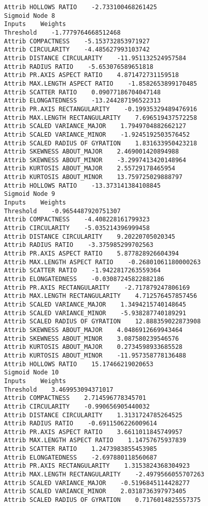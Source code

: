 \documentclass[
	article,			%
	11pt,				%
	oneside,			%
	a4paper,			%
	english,			%
	brazil,				%
	sumario=tradicional
	]{abntex2}
\begin{document}
\begin{lstlisting}
Attrib HOLLOWS RATIO    -2.733100468261425
Sigmoid Node 8
Inputs    Weights
Threshold    -1.7779764668512468
Attrib COMPACTNESS    -5.153732853971927
Attrib CIRCULARITY    -4.485627993103742
Attrib DISTANCE CIRCULARITY    -11.951132524957584
Attrib RADIUS RATIO    -5.653076589651818
Attrib PR.AXIS ASPECT RATIO    4.871472731159518
Attrib MAX.LENGTH ASPECT RATIO    -1.8582653899170485
Attrib SCATTER RATIO    0.09077186704047148
Attrib ELONGATEDNESS    -13.244287196522313
Attrib PR.AXIS RECTANGULARITY    -0.19935329489476916
Attrib MAX.LENGTH RECTANGULARITY    7.696519437572258
Attrib SCALED VARIANCE_MAJOR    1.7949704882662127
Attrib SCALED VARIANCE_MINOR    -1.9245192503576452
Attrib SCALED RADIUS OF GYRATION    1.831633950423218
Attrib SKEWNESS ABOUT_MAJOR    2.469001420894988
Attrib SKEWNESS ABOUT_MINOR    -3.2997413420148964
Attrib KURTOSIS ABOUT_MAJOR    2.55729178465954
Attrib KURTOSIS ABOUT_MINOR    13.759725029888797
Attrib HOLLOWS RATIO    -13.373141384108845
Sigmoid Node 9
Inputs    Weights
Threshold    -0.9654487920751307
Attrib COMPACTNESS    -4.408228161799323
Attrib CIRCULARITY    -5.035214396999458
Attrib DISTANCE CIRCULARITY    9.20220705020345
Attrib RADIUS RATIO    -3.375985299702563
Attrib PR.AXIS ASPECT RATIO    5.877828926604394
Attrib MAX.LENGTH ASPECT RATIO    -0.26801061180000263
Attrib SCATTER RATIO    -1.9422817263559364
Attrib ELONGATEDNESS    -0.03087245822882186
Attrib PR.AXIS RECTANGULARITY    -2.717879247806169
Attrib MAX.LENGTH RECTANGULARITY    4.712576457857456
Attrib SCALED VARIANCE_MAJOR    1.3494215740148645
Attrib SCALED VARIANCE_MINOR    -5.938287740189291
Attrib SCALED RADIUS OF GYRATION    12.888359022873908
Attrib SKEWNESS ABOUT_MAJOR    4.0486912669943464
Attrib SKEWNESS ABOUT_MINOR    3.087580239546576
Attrib KURTOSIS ABOUT_MAJOR    0.2734598933685528
Attrib KURTOSIS ABOUT_MINOR    -11.957358778136488
Attrib HOLLOWS RATIO    15.17466219020653
Sigmoid Node 10
Inputs    Weights
Threshold    3.469953094371017
Attrib COMPACTNESS    2.714596778345701
Attrib CIRCULARITY    -0.990656905440032
Attrib DISTANCE CIRCULARITY    1.3131724785264525
Attrib RADIUS RATIO    -0.6911506226009614
Attrib PR.AXIS ASPECT RATIO    3.6611011845749957
Attrib MAX.LENGTH ASPECT RATIO    1.14757675937839
Attrib SCATTER RATIO    1.2473983855453985
Attrib ELONGATEDNESS    -2.697880118560687
Attrib PR.AXIS RECTANGULARITY    1.3153824368304923
Attrib MAX.LENGTH RECTANGULARITY    -2.4979566055707263
Attrib SCALED VARIANCE_MAJOR    -0.5196845114428277
Attrib SCALED VARIANCE_MINOR    2.0318736397973405
Attrib SCALED RADIUS OF GYRATION    0.7176014825557375

\end{lstlisting}
\end{document}
